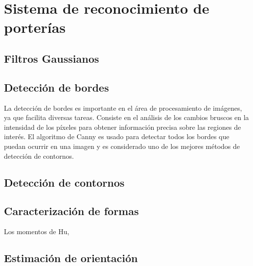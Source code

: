 \chapter{Sistema de reconocimiento de porterías}\label{sec:porteria}

\section{Filtros Gaussianos}

\section{Detección de bordes}
La detección de bordes es importante en el área de procesamiento de imágenes, ya que facilita diversas tareas. Consiste en el análisis de los cambios bruscos en la intensidad de los píxeles para obtener información precisa sobre las regiones de interés.\cite{rebaza2007deteccion} El algoritmo de Canny es usado para detectar todos los bordes que puedan ocurrir en una imagen y es considerado uno de los mejores métodos de detección de contornos.

\section{Detección de contornos}

\section{Caracterización de formas}
Los momentos de Hu, 

\section{Estimación de orientación}